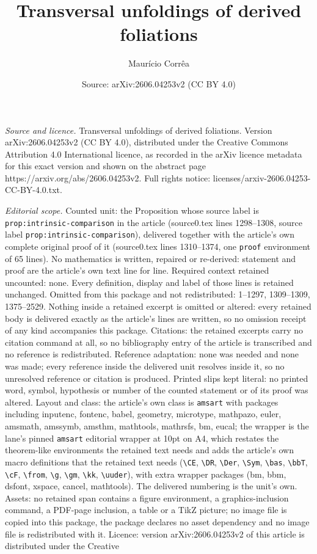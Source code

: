 \documentclass[10pt,a4paper]{amsart}
\title[Transversal unfoldings of derived foliations]{Transversal unfoldings of derived foliations}
\author{Maur\'icio Corr\^ea}
\date{Source: arXiv:2606.04253v2 (CC BY 4.0)}
\begin{document}
\maketitle

\noindent\emph{Source and licence.} Transversal unfoldings of derived foliations. Version arXiv:2606.04253v2 (CC BY 4.0), distributed under the Creative Commons Attribution 4.0 International licence, as recorded in the arXiv licence metadata for this exact version and shown on the abstract page https://arxiv.org/abs/2606.04253v2. Full rights notice: licenses/arxiv-2606.04253-CC-BY-4.0.txt.\par\smallskip

\noindent\textit{Editorial scope.} Counted unit: the Proposition whose source label is \texttt{prop:intrinsic-comparison} in the article (source0.tex lines 1298--1308, source label \texttt{prop:intrinsic-comparison}), delivered together with the article's own complete original proof of it (source0.tex lines 1310--1374, one \texttt{proof} environment of 65 lines). No mathematics is written, repaired or re-derived: statement and proof are the article's own text line for line. Required context retained uncounted: none. Every definition, display and label of those lines is retained unchanged. Omitted from this package and not redistributed: 1--1297, 1309--1309, 1375--2529. Nothing inside a retained excerpt is omitted or altered: every retained body is delivered exactly as the article's lines are written, so no omission receipt of any kind accompanies this package. Citations: the retained excerpts carry no citation command at all, so no bibliography entry of the article is transcribed and no reference is redistributed. Reference adaptation: none was needed and none was made; every reference inside the delivered unit resolves inside it, so no unresolved reference or citation is produced. Printed slips kept literal: no printed word, symbol, hypothesis or number of the counted statement or of its proof was altered. Layout and class: the article's own class is \texttt{amsart} with packages including inputenc, fontenc, babel, geometry, microtype, mathpazo, euler, amsmath, amssymb, amsthm, mathtools, mathrsfs, bm, eucal; the wrapper is the lane's pinned \texttt{amsart} editorial wrapper at 10pt on A4, which restates the theorem-like environments the retained text needs and adds the article's own macro definitions that the retained text needs (\texttt{\textbackslash CE}, \texttt{\textbackslash DR}, \texttt{\textbackslash Der}, \texttt{\textbackslash Sym}, \texttt{\textbackslash bas}, \texttt{\textbackslash bbT}, \texttt{\textbackslash cF}, \texttt{\textbackslash from}, \texttt{\textbackslash g}, \texttt{\textbackslash gm}, \texttt{\textbackslash kk}, \texttt{\textbackslash uuder}), with extra wrapper packages (bm, bbm, dsfont, xspace, cancel, mathtools). The delivered numbering is the unit's own. Assets: no retained span contains a figure environment, a graphics-inclusion command, a PDF-page inclusion, a table or a TikZ picture; no image file is copied into this package, the package declares no asset dependency and no image file is redistributed with it. Licence: version arXiv:2606.04253v2 of this article is distributed under the Creative 
\end{document}
